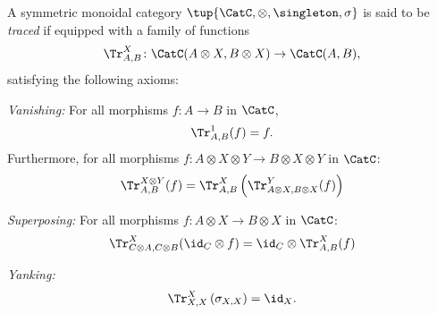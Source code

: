 \begin{shaded}
\begin{definition}
A symmetric monoidal category $\tup{\CatC, \otimes, \singleton, \sigma}$ is said to be \emph{traced} if equipped with a family of functions
\begin{equation}
    \Tr_{A,B}^X\colon \CatC(A\otimes X, B\otimes X)\to \CatC(A,B),
\end{equation}
satisfying the following axioms:
\begin{compactenum}
    \item \emph{Vanishing:} For all morphisms $f\colon A\to B$ in $\CatC$,
    \begin{equation}
    \Tr_{A,B}^1(f)=f.
    \end{equation}
    Furthermore, for all morphisms $f\colon A\otimes X \otimes Y \to B\otimes X \otimes Y$ in $\CatC$:
    \begin{equation}
        \Tr_{A,B}^{X\otimes Y}(f)=\Tr_{A,B}^X\left(
        \Tr_{A\otimes X,B\otimes X}^Y(f)\right)
    \end{equation}
    \item \emph{Superposing:} For all morphisms $f\colon A\otimes X\to B\otimes X$ in $\CatC$:
    \begin{equation}
        \Tr_{C\otimes A,C\otimes B}^{X}(\id_C\otimes f)=\id_C\otimes \Tr_{A,B}^X(f)
    \end{equation}
    \item \emph{Yanking:} 
    \begin{equation}
    \Tr_{X,X}^X\left(\sigma_{X,X}\right)=\id_X.
    \end{equation}
\end{compactenum}
\end{definition}
\end{shaded}



